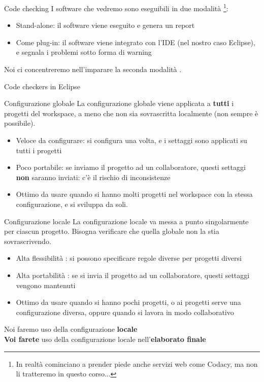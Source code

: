 \documentclass[presentation]{beamer}
\begin{document}
\begin{frame}[allowframebreaks]{Code checking}
	I software che vedremo sono eseguibili in due modalità \footnote{In realtà  cominciano a prender piede anche servizi web come Codacy, ma non li tratteremo in questo corso...}:
	\begin{itemize}
		\item Stand-alone: il software viene eseguito e genera un report
		\item Come plug-in: il software viene integrato con l'IDE (nel nostro caso Eclipse), e segnala i problemi sotto forma di warning
	\end{itemize}
	Noi ci concentreremo nell'imparare la seconda modalità .
\end{frame}
\begin{frame}[allowframebreaks]{Code checkers in Eclipse}
	\begin{block}{Configurazione globale}
	La configurazione globale viene applicata a \textbf{tutti} i progetti del workspace, a meno che non sia sovrascritta localmente (non sempre è possibile).
		\begin{itemize}
			\item Veloce da configurare: si configura una volta, e i settaggi sono applicati su tutti i progetti
			\item Poco portabile: se inviamo il progetto ad un collaboratore, questi settaggi \textbf{non} saranno inviati: c'è il rischio di inconsistenze
			\item Ottimo da usare quando si hanno molti progetti nel workspace con la stessa configurazione, e si sviluppa da soli.
		\end{itemize}
	\end{block}
	\begin{block}{Configurazione locale}
	La configurazione locale va messa a punto singolarmente per ciascun progetto. Bisogna verificare che quella globale non la stia sovrascrivendo.
		\begin{itemize}
			\item Alta flessibilità : si possono specificare regole diverse per progetti diversi
			\item Alta portabilità : se si invia il progetto ad un collaboratore, questi settaggi vengono mantenuti
			\item Ottimo da usare quando si hanno pochi progetti, o ai progetti serve una configurazione diversa, oppure quando si lavora in modo collaborativo
		\end{itemize}
	\end{block}
	\begin{center}
		Noi faremo uso della configurazione \textbf{locale} \\
		\textbf{Voi farete} uso della configurazione locale nell'\textbf{elaborato finale}
	\end{center}

\end{frame}
\end{document}
